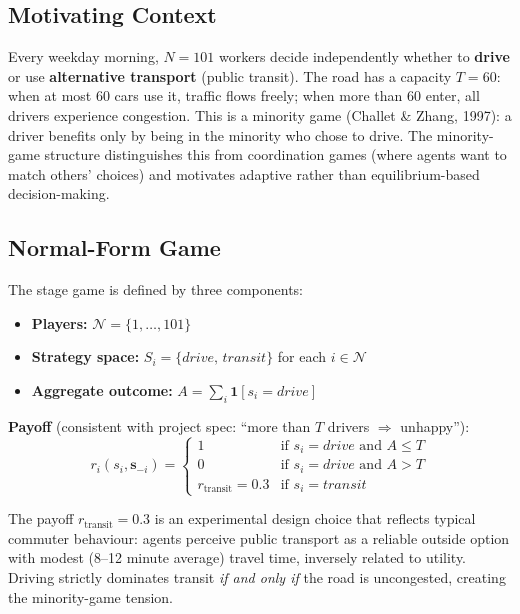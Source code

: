 \subsection{Motivating Context}

Every weekday morning, $N=101$ workers decide independently whether to \textbf{drive} or use \textbf{alternative transport} (public transit). The road has a capacity $T=60$: when at most 60 cars use it, traffic flows freely; when more than 60 enter, all drivers experience congestion. This is a minority game (Challet \& Zhang, 1997): a driver benefits only by being in the minority who chose to drive. The minority-game structure distinguishes this from coordination games (where agents want to match others' choices) and motivates adaptive rather than equilibrium-based decision-making. \\

\subsection{Normal-Form Game}

The stage game is defined by three components: \\

\begin{itemize}
    \item \textbf{Players:} $\mathcal{N} = \{1,\ldots, 101\}$
    \item \textbf{Strategy space:} $S_i = \{\textit{drive},\, \textit{transit}\}$ for each $i \in \mathcal{N}$
    \item \textbf{Aggregate outcome:} $A = \sum_{i} \mathbf{1}[s_i = \textit{drive}]$
\end{itemize}

\textbf{Payoff} (consistent with project spec: ``more than $T$ drivers $\Rightarrow$ unhappy''): \\

\begin{equation}
r_i(s_i, \mathbf{s}_{-i}) = \begin{cases} 1 & \text{if } s_i = \textit{drive} \text{ and } A \leq T \\ 0 & \text{if } s_i = \textit{drive} \text{ and } A > T \\ r_{\text{transit}} = 0.3 & \text{if } s_i = \textit{transit} \end{cases}
\end{equation}

The payoff $r_{\text{transit}} = 0.3$ is an experimental design choice that reflects typical commuter behaviour: agents perceive public transport as a reliable outside option with modest (8--12 minute average) travel time, inversely related to utility. Driving strictly dominates transit \textit{if and only if} the road is uncongested, creating the minority-game tension. \\

